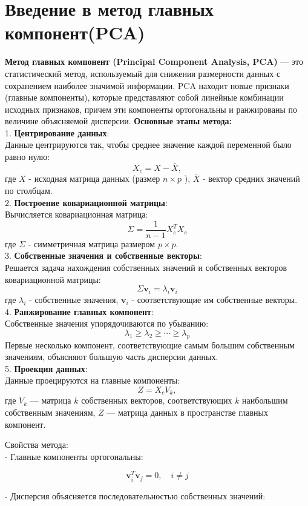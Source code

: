 \section{Введение в метод главных компонент(PCA)}
\textbf{Метод главных компонент (Principal Component Analysis, PCA)} — это статистический метод, используемый для снижения размерности данных с сохранением наиболее значимой информации. PCA находит новые признаки (главные компоненты),
которые представляют собой линейные комбинации исходных признаков, причем эти компоненты ортогональны и ранжированы по величине объясняемой дисперсии.
\textbf{Основные этапы метода:} \\
1. \textbf{Центрирование данных}:\\ Данные центрируются так, чтобы среднее значение каждой переменной было равно нулю:
$$
    X_c=X-\bar{X},
$$
где $X$ - исходная матрица данных (размер $n \times p$ ), $\bar{X}$ - вектор средних значений по столбцам.\\
2. \textbf{Построение ковариационной матрицы}: \\ Вычисляется ковариационная матрица:
$$
    \Sigma=\frac{1}{n-1} X_c^T X_c
$$
где $\Sigma$ - симметричная матрица размером $p \times p$.\\
3. \textbf{Собственные значения и собственные векторы}: \\ Решается задача нахождения собственных значений и собственных векторов ковариационной матрицы:
$$
    \Sigma \mathbf{v}_i=\lambda_i \mathbf{v}_i
$$
где $\lambda_i$ - собственные значения, $\mathbf{v}_i$ - соответствующие им собственные векторы.\\
4. \textbf{Ранжирование главных компонент}: \\ Собственные значения упорядочиваются по убыванию:
$$
    \lambda_1 \geq \lambda_2 \geq \cdots \geq \lambda_p
$$
Первые несколько компонент, соответствующие самым большим собственным значениям, объясняют большую часть дисперсии данных.\\
5. \textbf{Проекция данных}: \\ Данные проецируются на главные компоненты:
$$
    Z=X_c V_k,
$$
где $V_k$ — матрица $k$ собственных векторов, соответствующих $k$ наибольшим собственным значениям, $Z$ — матрица данных в пространстве главных компонент.

Свойства метода: \\
- Главные компоненты ортогональны:

$$
    \mathbf{v}_i^T \mathbf{v}_j=0, \quad i \neq j
$$

- Дисперсия объясняется последовательностью собственных значений:

